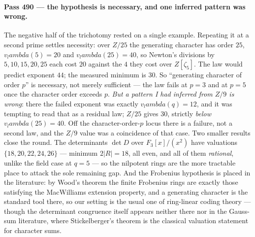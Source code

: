 \documentclass[12pt,a4paper]{article}
\def\mathbb#1{#1}%
\def\textbf#1{#1}%
\def\lambda{lambda}%
\theoremstyle{definition}
\newcommand{\FF}{\mathbb{F}}
\newcommand{\ZZ}{\mathbb{Z}}
\begin{document}
\paragraph{Pass 490 --- the hypothesis is necessary, and one inferred pattern
was wrong.}
The negative half of the trichotomy rested on a single example.  Repeating it at
a second prime settles necessity: over $\ZZ/25$ the generating character has
order $25$, $v_\lambda(5)=20$ and $v_\lambda(25)=40$, so Newton's divisions by
$5,10,15,20,25$ each cost $20$ against the $4$ they cost over $\ZZ[\zeta_5]$.
The law would predict exponent $44$; the measured minimum is $30$.  So
\textbf{``generating character of order $p$'' is necessary, not merely
sufficient} --- the law fails at $p=3$ and at $p=5$ once the character order
exceeds $p$.  \emph{But a pattern I had inferred from $\ZZ/9$ is wrong}: there
the failed exponent was exactly $v_\lambda(q)=12$, and it was tempting to read
that as a residual law; $\ZZ/25$ gives $30$, strictly \emph{below}
$v_\lambda(25)=40$.  Off the character-order-$p$ locus there is a failure, not
a second law, and the $\ZZ/9$ value was a coincidence of that case.  Two
smaller results close the round.  The determinants $\det D$ over
$\FF_3[x]/(x^2)$ have valuations $\{18,20,22,24,26\}$ --- minimum $2|R|=18$,
all even, and all of them \emph{rational}, unlike the field case at $q=5$ ---
so the nilpotent rings are the more tractable place to attack the sole
remaining gap.  And the Frobenius hypothesis is placed in the literature: by
Wood's theorem the finite Frobenius rings are exactly those satisfying the
MacWilliams extension property, and a generating character is the standard tool
there, so our setting is the usual one of ring-linear coding theory --- though
the determinant congruence itself appears neither there nor in the Gauss-sum
literature, where Stickelberger's theorem is the classical valuation statement
for character sums.
\end{document}
